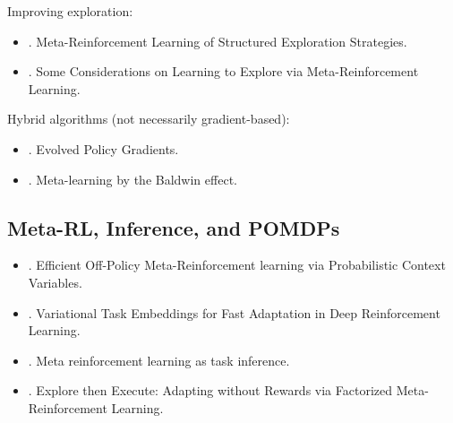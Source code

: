 Improving exploration:
\begin{itemize}
	\item {}. Meta-Reinforcement Learning of Structured Exploration Strategies.
	\item {}. Some Considerations on Learning to Explore via Meta-Reinforcement Learning.
\end{itemize}
	
Hybrid algorithms (not necessarily gradient-based):
\begin{itemize}
	\item {}. Evolved Policy Gradients.
	\item {}. Meta-learning by the Baldwin effect.
\end{itemize}

\subsection{Meta-RL, Inference, and POMDPs}
\begin{itemize}
	\item {}. Efficient Off-Policy Meta-Reinforcement learning via Probabilistic Context Variables.
	\item {}. Variational Task Embeddings for Fast Adaptation in Deep Reinforcement Learning.
	\item {}. Meta reinforcement learning as task inference.
	\item {}. Explore then Execute: Adapting without Rewards via Factorized Meta-Reinforcement Learning.
\end{itemize}
